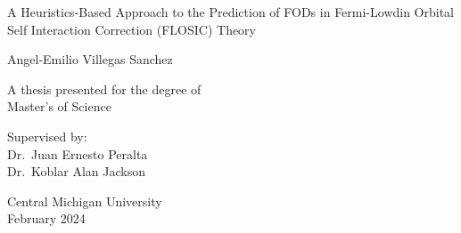 \documentclass[12pt,a4paper,]{report}
\begin{document}
\begin{titlepage}
    \begin{center}


        \vspace*{2.5cm}

        \huge
        A Heuristics-Based Approach to the Prediction of FODs in
        Fermi-Lowdin Orbital Self Interaction Correction (FLOSIC) Theory

        

        \vspace{1.5cm}

        \Large
        Angel-Emilio Villegas Sanchez

        \vspace{1.5cm}

        \normalsize
        A thesis presented for the degree of\\
        Master's of Science

        \vfill

        \normalsize
        Supervised by:\\
        Dr.~Juan Ernesto Peralta \\ Dr.~Koblar Alan Jackson

        \vspace{0.8cm}


        \normalsize
        Central Michigan University\\
        February 2024


    \end{center}
\end{titlepage}



\tableofcontents

\newpage
\end{document}
